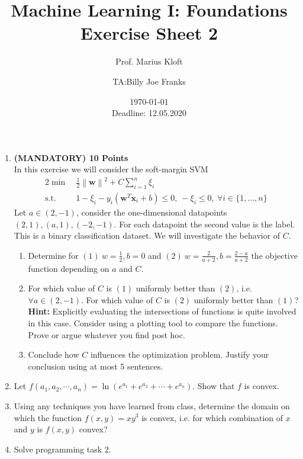 \documentclass[]{scrartcl}
\author{Prof. Marius Kloft \and TA:Billy Joe Franks}
\title{Machine Learning I: Foundations \\ Exercise Sheet 2}
\date{\today\\Deadline: 12.05.2020}
\newcommand{\bx}{\mathbf{x}}
\newcommand{\bw}{\mathbf{w}}
\begin{document}
\maketitle

\begin{enumerate}

\item \textbf{(MANDATORY) 10 Points}\\
	In this exercise we will consider the soft-margin SVM
	\begin{alignat}{2}
   \min~&  \frac{1}{2}\left\lVert\bw\right\rVert^2+C\sum_{i=1}^n \xi_i\nonumber \\
   \text{s.t.}~  & 1-\xi_i-y_i(\bw^T\bx_i+b) \leq 0,~-\xi_i\leq 0,~\forall i\in\{1,\dots,n\}\nonumber
\end{alignat}
Let $a\in(2,-1)$, consider the one-dimensional datapoints $(2,1), (a,1), (-2,-1)$. For each datapoint the second value is the label. This is a binary classification dataset. We will investigate the behavior of $C$.
\begin{enumerate}
\item Determine for $(1)~w=\frac{1}{2}, b=0$ and $(2)~w=\frac{2}{a+2}, b=\frac{2-a}{a+2}$ the objective function depending on $a$ and $C$.
\item For which value of $C$ is $(1)$ uniformly better than $(2)$, i.e. $\forall a\in (2,-1)$. For which value of $C$ is $(2)$ uniformly better than $(1)$?
\textbf{Hint:} Explicitly evaluating the intersections of functions is quite involved in this case. Consider using a plotting tool to compare the functions. Prove or argue whatever you find post hoc.
\item Conclude how $C$ influences the optimization problem. Justify your conclusion using at most 5 sentences.
\end{enumerate}

\item Let $f(a_1,a_2, \cdots, a_n) = \ln{( e^{a_1}+ e^{a_2}+\cdots+ e^{a_n})}$. Show that $f$ is convex.

\item Using any techniques you have learned from class, determine the domain on which the function $f(x,y) = xy^3$ is convex, i.e. for which combination of $x$ and $y$ is $f(x,y)$ convex?

\item Solve programming task 2.
\end{enumerate}
\end{document}
